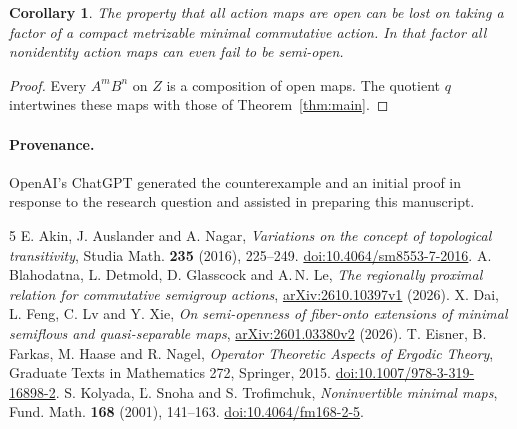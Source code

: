 \documentclass[11pt,a4paper]{article}
\newtheorem{corollary}[theorem]{Corollary}
\begin{document}
\begin{corollary}
The property that all action maps are open can be lost on taking a factor
of a compact metrizable minimal commutative action. In that factor all
nonidentity action maps can even fail to be semi-open.
\end{corollary}
\begin{proof}
Every $A^mB^n$ on $Z$ is a composition of open maps. The quotient $q$
intertwines these maps with those of Theorem~\ref{thm:main}.
\end{proof}

\paragraph{Provenance.}
OpenAI's ChatGPT generated the counterexample and an initial proof in
response to the research question and assisted in preparing this manuscript.

\begin{thebibliography}{5}\small
{} E. Akin, J. Auslander and A. Nagar,
\emph{Variations on the concept of topological transitivity},
Studia Math. \textbf{235} (2016), 225--249.
\href{https://doi.org/10.4064/sm8553-7-2016}{doi:10.4064/sm8553-7-2016}.
 A. Blahodatna, L. Detmold, D. Glasscock and A.\,N. Le,
\emph{The regionally proximal relation for commutative semigroup actions},
\href{https://arxiv.org/abs/2610.10397v1}{arXiv:2610.10397v1} (2026).
 X. Dai, L. Feng, C. Lv and Y. Xie,
\emph{On semi-openness of fiber-onto extensions of minimal semiflows and
quasi-separable maps}, \href{https://arxiv.org/abs/2601.03380v2}{arXiv:2601.03380v2} (2026).
 T. Eisner, B. Farkas, M. Haase and R. Nagel,
\emph{Operator Theoretic Aspects of Ergodic Theory}, Graduate Texts in
Mathematics 272, Springer, 2015.
\href{https://doi.org/10.1007/978-3-319-16898-2}{doi:10.1007/978-3-319-16898-2}.
 S. Kolyada, \v{L}. Snoha and S. Trofimchuk,
\emph{Noninvertible minimal maps}, Fund. Math. \textbf{168} (2001), 141--163.
\href{https://doi.org/10.4064/fm168-2-5}{doi:10.4064/fm168-2-5}.
\end{thebibliography}
\end{document}
